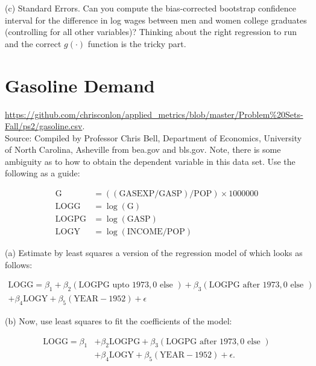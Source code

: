 \documentclass[11pt]{article}
\begin{document}
(c) Standard Errors. Can you compute the bias-corrected bootstrap confidence interval for the difference in log wages between men and women college graduates (controlling for all other variables)? Thinking about the right regression to run and the correct $g(\cdot)$ function is the tricky part.





\section{Gasoline Demand}
\url{https://github.com/chrisconlon/applied_metrics/blob/master/Problem%20Sets-Fall/ps2/gasoline.csv}.\\

Source: Compiled by Professor Chris Bell, Department of Economics, University of North Carolina, Asheville from bea.gov and bls.gov.
Note, there is some ambiguity as to how to obtain the dependent variable in this data set. Use the following as a guide:

$$
\begin{aligned}
\mathrm{G} & =((\mathrm{GASEXP} / \mathrm{GASP}) / \mathrm{POP}) \times 1000000 \\
\mathrm{LOGG} & =\log (\mathrm{G}) \\
\mathrm{LOGPG} & =\log (\mathrm{GASP}) \\
\mathrm{LOGY} & =\log (\mathrm{INCOME} / \mathrm{POP})
\end{aligned}
$$

(a) Estimate by least squares a version of the regression model of which looks as follows:

$$
\begin{gathered}
\mathrm{LOGG}=\beta_1+\beta_2(\mathrm{LOGPG} \text { upto } 1973,0 \text { else })+\beta_3(\mathrm{LOGPG} \text { after } 1973,0 \text { else }) \\
+\beta_4 \mathrm{LOGY}+\beta_5(\mathrm{YEAR}-1952)+\epsilon
\end{gathered}
$$

(b) Now, use least squares to fit the coefficients of the model:

$$
\begin{aligned}
\mathrm{LOGG}=\beta_1 & +\beta_2 \mathrm{LOGPG}+\beta_3(\mathrm{LOGPG} \text { after } 1973,0 \text { else }) \\
& +\beta_4 \mathrm{LOGY}+\beta_5(\mathrm{YEAR}-1952)+\epsilon .
\end{aligned}
$$
\end{document}
